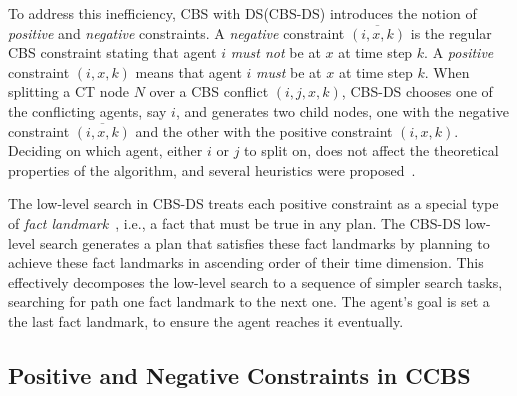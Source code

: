 \documentclass[letterpaper]{article} %
\newcommand\konstantin[1]{\nb{\textbf{Konstantin:}}{red}{#1}}
\newcommand\roni[1]{\nb{\textbf{Roni:}}{orange}{#1}}
\newcommand{\cbs}{\ac{CBS}\xspace}
\newcommand{\ccbs}{\ac{CCBS}\xspace}
\newcommand{\cbsds}{{CBS-DS}\xspace}
\newcommand{\ct}{\ac{CT}\xspace}
\newcommand{\mapf}{\ac{MAPF}\xspace}
\newcommand{\ds}{\ac{DS}\xspace}
\begin{document}
To address this inefficiency, \cbs with \ds (\cbsds) introduces the notion of \emph{positive} and \emph{negative} constraints.   
A \emph{negative} constraint $\overline{(i, x, k)}$ is the regular \cbs constraint stating that agent $i$ \emph{must not} be at $x$ at time step $k$.
A \emph{positive} constraint $(i, x, k)$ means that agent $i$ \emph{must} be at $x$ at time step $k$. %
When splitting a \ct node $N$ over a \cbs conflict $(i, j, x, k)$, 
\cbsds chooses one of the conflicting agents, say $i$, 
and generates two child nodes, one with the negative constraint $\overline{(i, x, k)}$ 
and the other with the positive constraint $(i,x,k)$. 
Deciding on which agent, either $i$ or $j$ to split on, does not affect the theoretical properties of the algorithm, and several heuristics were proposed~\cite{li2019disjoint}. 

The low-level search in \cbsds 
treats each positive constraint as a special type of \emph{fact landmark}~\cite{richter2008landmarks}, i.e., a fact that must be true in any plan. %
The \cbsds low-level search generates a plan that satisfies these fact landmarks by 
planning to achieve these fact landmarks in ascending order of their time dimension. 
This effectively decomposes the low-level search to a sequence of simpler search tasks, searching for path one fact landmark to the next one. 
The agent's goal is set a the last fact landmark, to ensure the agent reaches it eventually. %


\subsection{Positive and Negative Constraints in \ccbs}
\end{document}
